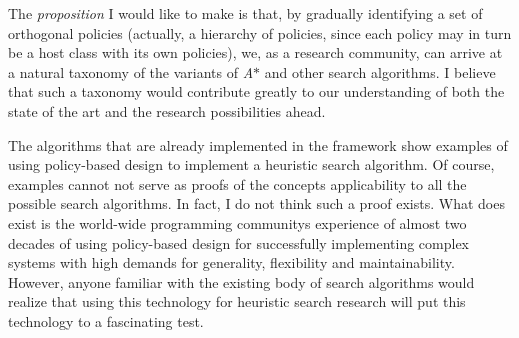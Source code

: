 The {\itshape proposition} I would like to make is that, by gradually identifying a set of orthogonal policies (actually, a hierarchy of policies, since each policy may in turn be a host class with its own policies), we, as a research community, can arrive at a natural taxonomy of the variants of {\itshape A$\ast$} and other search algorithms. I believe that such a taxonomy would contribute greatly to our understanding of both the state of the art and the research possibilities ahead.

The algorithms that are already implemented in the framework show examples of using policy-\/based design to implement a heuristic search algorithm. Of course, examples cannot not serve as proofs of the concept\textquotesingle{}s applicability to all the possible search algorithms. In fact, I do not think such a proof exists. What does exist is the world-\/wide programming community\textquotesingle{}s experience of almost two decades of using policy-\/based design for successfully implementing complex systems with high demands for generality, flexibility and maintainability. However, anyone familiar with the existing body of search algorithms would realize that using this technology for heuristic search research will put this technology to a fascinating test.

